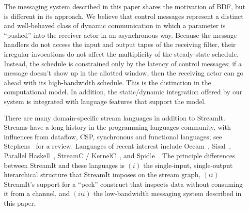 The messaging system described in this paper shares the motivation of
BDF, but is different in its approach.  We believe that control
messages represent a distinct and well-behaved class of dynamic
communication in which a parameter is ``pushed'' into the receiver
actor in an asynchronous way.  Because the message handlers do not
access the input and output tapes of the receiving filter, their
irregular invocations do not affect the multiplicity of the
steady-state schedule.  Instead, the schedule is constrained only by
the latency of control messages; if a message doesn't show up in the
allotted window, then the receiving actor can go ahead with its
high-bandwidth schedule.  This is the distinction in the computational
model.  In addition, the static/dynamic integration offered by our
system is integrated with language features that support the model.

There are many domain-specific stream languages in addition to
StreamIt.  Streams have a long history in the programming languages
community, with influences from dataflow, CSP, synchronous and
functional languages; see Stephens~\cite{survey97} for a review.
Languages of recent interest include Occam~\cite{occammanual},
Sisal~\cite{sisal}, Parallel Haskell~\cite{ph}, StreamC /
KernelC~\cite{imagine03ieee}, and Spidle~\cite{spidle02}.  The
principle differences between StreamIt and these languages is $(i)$ the
single-input, single-output hierarchical structure that StreamIt
imposes on the stream graph, $(ii)$ StreamIt's support for a ``peek''
construct that inspects data without consuming it from a channel, and $(iii)$
the low-bandwidth messaging system described in this paper.
